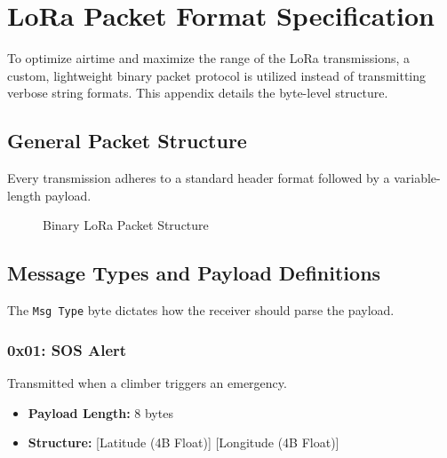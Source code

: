 \chapter{LoRa Packet Format Specification}
\label{app:packet_format}

To optimize airtime and maximize the range of the LoRa transmissions, a custom, lightweight binary packet protocol is utilized instead of transmitting verbose string formats. This appendix details the byte-level structure.

\section{General Packet Structure}

Every transmission adheres to a standard header format followed by a variable-length payload.

\begin{figure}[htbp]
    \centering
    \caption{Binary LoRa Packet Structure}
    \label{fig:packet-structure}
\end{figure}

\section{Message Types and Payload Definitions}

The \texttt{Msg Type} byte dictates how the receiver should parse the payload.

\subsection{0x01: SOS Alert}
Transmitted when a climber triggers an emergency.
\begin{itemize}
    \item \textbf{Payload Length:} 8 bytes
    \item \textbf{Structure:} [Latitude (4B Float)] [Longitude (4B Float)]
\end{itemize}


